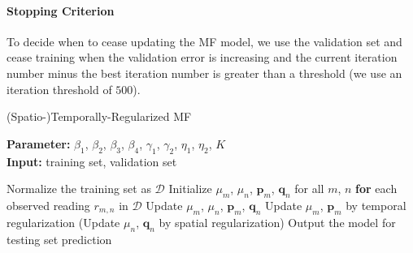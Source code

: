 \paragraph*{Stopping Criterion}

To decide when to cease updating the MF model, we use the validation set and cease training when the validation error is increasing and the current iteration number minus the best iteration number is greater than a threshold (we use an iteration threshold of $500$). 

\begin{algorithm}
	\caption{(Spatio-)Temporally-Regularized MF}
	\label{alg:STRMF}
	\textbf{Parameter:} $\beta_1$, $\beta_2$, $\beta_3$, $\beta_4$, $\gamma_1$, $\gamma_2$, $\eta_1$, $\eta_2$, $K$\\
	\textbf{Input:} training set, validation set
	\begin{algorithmic}
		\State Normalize the training set as $\mathcal{D}$
		\State Initialize $\mu_m$, $\mu_n$, $\mathbf{p}_m$, $\mathbf{q}_n$ for all $m$, $n$
		\Repeat
			\State \textbf{for} each observed reading $r_{m,n}$ in $\mathcal{D}$
				\State \indent Update $\mu_m$, $\mu_n$, $\mathbf{p}_{m}$, $\mathbf{q}_{n}$
			\State Update $\mu_m$, $\mathbf{p}_m$ by temporal regularization
			\State (Update $\mu_n$, $\mathbf{q}_n$ by spatial regularization)
		\State Output the model for testing set prediction
	\end{algorithmic}
\end{algorithm}
